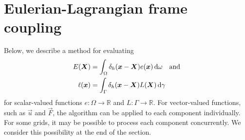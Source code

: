 \section{Eulerian-Lagrangian frame coupling}

Below, we describe a method for evaluating
\begin{align}
    \label{eq:scalar-interp}
    E(\vec{X}) &= \int_\Omega \delta_h(\vec{x}-\vec{X})e(\vec{x}) \d\omega \quad \text{and}\\
    \label{eq:scalar-spread}
    \ell(\vec{x}) &= \int_\Gamma \delta_h(\vec{x}-\vec{X})L(\vec{X}) \d\gamma
\end{align}
for scalar-valued functions $e: \Omega\to\mathbb{R}$ and $L:\Gamma\to\mathbb{R}$.
For vector-valued functions, such as $\vec{u}$ and $\vec{F}$, the algorithm
can be applied to each component individually. For some grids, it may be
possible to process each component concurrently. We consider this possibility
at the end of the section.





